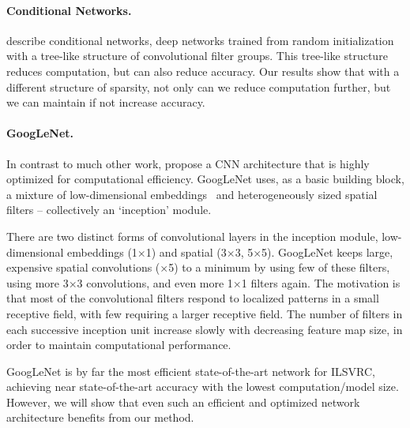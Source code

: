 \documentclass[thesis]{subfiles}
\begin{document}
	
	\paragraph{Conditional Networks.} \citet{Ioannou2015} describe conditional networks, \ie deep networks trained from random initialization with a tree-like structure of convolutional filter groups. This tree-like structure reduces computation, but can also reduce accuracy. Our results show that with a different structure of sparsity, not only can we reduce computation further, but we can maintain if not increase accuracy.
	
	\paragraph{GoogLeNet.} In contrast to much other work, \citet{Szegedy2014going} propose a CNN architecture that is highly optimized for computational efficiency. GoogLeNet uses, as a basic building block, a mixture of low-dimensional embeddings~\citep{Lin2014} and heterogeneously sized spatial filters -- collectively an `inception' module. 
	
	There are two distinct forms of convolutional layers in the inception module, low-dimensional embeddings (1$\times$1) and spatial (3$\times$3, 5$\times $5). GoogLeNet keeps large, expensive spatial convolutions ($\times$5) to a minimum by using few of these filters, using more 3$\times$3 convolutions, and even more 1$\times$1 filters again. The motivation is that most of the convolutional filters respond to localized patterns in a small receptive field, with few requiring a larger receptive field. The number of filters in each successive inception unit increase slowly with decreasing feature map size, in order to maintain computational performance.
	
	GoogLeNet is by far the most efficient state-of-the-art network for ILSVRC, achieving near state-of-the-art accuracy with the lowest computation/model size. However, we will show that even such an efficient and optimized network architecture benefits from our method.
	
\end{document}
